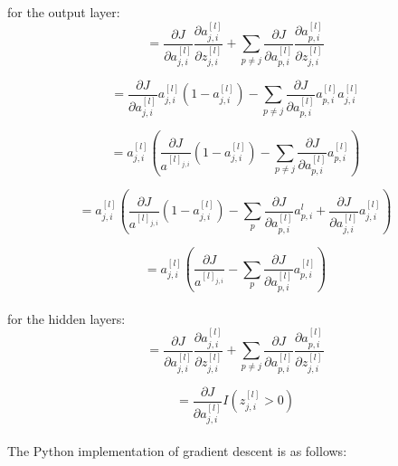 \documentclass[12pt]{article}
\begin{document}
for the output layer:\\[6px]
$$=\frac{\partial{J}}{\partial{a}^{[l]}_{j,i}}\frac{\partial{a}^{[l]}_{j,i}}{\partial{z}^{[l]}_{j,i}}+\sum_{p\neq{j}}{\frac{\partial{J}}{\partial{a}^{[l]}_{p,i}}\frac{\partial{a}^{[l]}_{p,i}}{\partial{z}^{[l]}_{j,i}}}$$

$$=\frac{\partial{J}}{\partial{a}^{[l]}_{j,i}} a^{[l]}_{j,i}\left(1-a^{[l]}_{j,i}\right)-\sum_{p\neq{j}}{\frac{\partial{J}}{\partial{a}^{[l]}_{p,i}}a^{[l]}_{p,i}a^{[l]}_{j,i}}$$

$$=a^{[l]}_{j,i}\left(\frac{\partial{J}}{a^{[l]_{j,i}}}\left(1-a^{[l]}_{j,i}\right)-\sum_{p\neq{j}}{\frac{\partial{J}}{\partial{a}^{[l]}_{p,i}}a^{[l]}_{p,i}}\right)$$

$$=a^{[l]}_{j,i}\left(\frac{\partial{J}}{a^{[l]_{j,i}}}\left(1-a^{[l]}_{j,i}\right)-\sum_p{\frac{\partial{J}}{\partial{a}^{[l]}_{p,i}}a^{l}_{p,i}+\frac{\partial{J}}{\partial{a}^{[l]}_{j,i}}a^{[l]}_{j,i}}\right)$$  

$$=a^{[l]}_{j,i}\left(\frac{\partial{J}}{a^{[l]_{j,i}}}-\sum_p{\frac{\partial{J}}{\partial{a}^{[l]}_{p,i}}a^{[l]}_{p,i}}\right)$$\\[6px]
 
for the hidden layers:\\[6px]

$$=\frac{\partial{J}}{\partial{a}^{[l]}_{j,i}}\frac{\partial{a}^{[l]}_{j,i}}{\partial{z}^{[l]}_{j,i}}+\sum_{p\neq{j}}{\frac{\partial{J}}{\partial{a}^{[l]}_{p,i}}\frac{\partial{a}^{[l]}_{p,i}}{\partial{z}^{[l]}_{j,i}}}$$

$$=\frac{\partial{J}}{\partial{a}^{[l]}_{j,i}}I\left(z^{[l]}_{j,i} > 0\right)$$\\[15px]

The Python implementation of gradient descent is as follows: 
\end{document}
